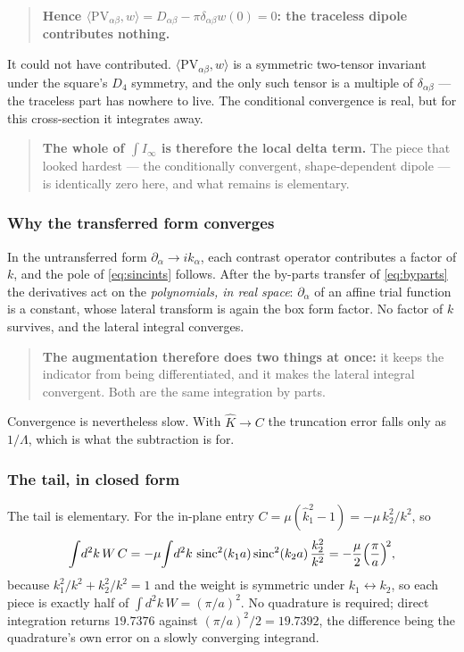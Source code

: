 \documentclass[11pt,a4paper]{article}
\begin{document}
\begin{quote}
\textbf{Hence $\langle \mathrm{PV}_{\alpha\beta}, w\rangle = D_{\alpha\beta} -
\pi\delta_{\alpha\beta}w(0) = 0$: the traceless dipole contributes nothing.}
\end{quote}

It could not have contributed.  $\langle\mathrm{PV}_{\alpha\beta},w\rangle$ is a
symmetric two-tensor invariant under the square's $D_4$ symmetry, and the only
such tensor is a multiple of $\delta_{\alpha\beta}$ --- the traceless part has
nowhere to live.  The conditional convergence is real, but for this cross-section
it integrates away.

\begin{quote}
\textbf{The whole of $\int I_\infty$ is therefore the local delta term.}  The
piece that looked hardest --- the conditionally convergent, shape-dependent
dipole --- is identically zero here, and what remains is elementary.
\end{quote}

\subsubsection{Why the transferred form converges}\label{sec:transferred}

In the untransferred form $\partial_\alpha \to ik_\alpha$, each contrast
operator contributes a factor of $k$, and the pole of \eqref{eq:sincints}
follows.  After the by-parts transfer of \eqref{eq:byparts} the derivatives act
on the \emph{polynomials, in real space}: $\partial_\alpha$ of an affine trial
function is a constant, whose lateral transform is again the box form factor.
No factor of $k$ survives, and the lateral integral converges.

\begin{quote}
\textbf{The augmentation therefore does two things at once:} it keeps the
indicator from being differentiated, and it makes the lateral integral
convergent.  Both are the same integration by parts.
\end{quote}

Convergence is nevertheless slow.  With $\widehat{K}\to C$ the truncation error
falls only as $1/\Lambda$, which is what the subtraction is for.

\subsubsection{The tail, in closed form}

The tail is elementary.  For the in-plane entry
$C = \mu(\hat{k}_1^2-1) = -\mu\,k_2^2/k^2$, so
\begin{equation}\label{eq:tail}
  \int\! d^2k\,W\,C = -\mu\!\int\! d^2k\,
    \operatorname{sinc}^2(k_1a)\operatorname{sinc}^2(k_2a)\,\frac{k_2^2}{k^2}
  = -\frac{\mu}{2}\Bigl(\frac{\pi}{a}\Bigr)^{\!2},
\end{equation}
because $k_1^2/k^2 + k_2^2/k^2 = 1$ and the weight is symmetric under
$k_1\!\leftrightarrow\!k_2$, so each piece is exactly half of
$\int\!d^2k\,W = (\pi/a)^2$.  No quadrature is required; direct integration
returns $19.7376$ against $(\pi/a)^2/2 = 19.7392$, the difference being the
quadrature's own error on a slowly converging integrand.
\end{document}
